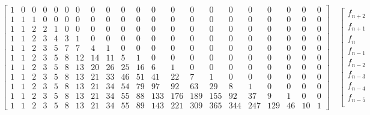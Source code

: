 \documentclass[a4paper,dottedtoc,headinclude,footinclude]{report} %
\theoremstyle{plain}
\begin{document}
    \begin{table}
        \begin{displaymath}
            \left[
                \begin{array}{ccccccccccccccccccccc}
                1 & 0 & 0 & 0 & 0 & 0 & 0 & 0 & 0 & 0 & 0 & 0 & 0 & 0 & 0 & 0 & 0 & 0 & 0 & 0 & 0\\
                1 & 1 & 1 & 0 & 0 & 0 & 0 & 0 & 0 & 0 & 0 & 0 & 0 & 0 & 0 & 0 & 0 & 0 & 0 & 0 & 0\\
                1 & 1 & 2 & 2 & 1 & 0 & 0 & 0 & 0 & 0 & 0 & 0 & 0 & 0 & 0 & 0 & 0 & 0 & 0 & 0 & 0\\
                1 & 1 & 2 & 3 & 4 & 3 & 1 & 0 & 0 & 0 & 0 & 0 & 0 & 0 & 0 & 0 & 0 & 0 & 0 & 0 & 0\\
                1 & 1 & 2 & 3 & 5 & 7 & 7 & 4 & 1 & 0 & 0 & 0 & 0 & 0 & 0 & 0 & 0 & 0 & 0 & 0 & 0\\
                1 & 1 & 2 & 3 & 5 & 8 & 12 & 14 & 11 & 5 & 1 & 0 & 0 & 0 & 0 & 0 & 0 & 0 & 0 & 0 & 0\\
                1 & 1 & 2 & 3 & 5 & 8 & 13 & 20 & 26 & 25 & 16 & 6 & 1 & 0 & 0 & 0 & 0 & 0 & 0 & 0 & 0\\
                1 & 1 & 2 & 3 & 5 & 8 & 13 & 21 & 33 & 46 & 51 & 41 & 22 & 7 & 1 & 0 & 0 & 0 & 0 & 0 & 0\\
                1 & 1 & 2 & 3 & 5 & 8 & 13 & 21 & 34 & 54 & 79 & 97 & 92 & 63 & 29 & 8 & 1 & 0 & 0 & 0 & 0\\
                1 & 1 & 2 & 3 & 5 & 8 & 13 & 21 & 34 & 55 & 88 & 133 & 176 & 189 & 155 & 92 & 37 & 9 & 1 & 0 & 0\\
                1 & 1 & 2 & 3 & 5 & 8 & 13 & 21 & 34 & 55 & 89 & 143 & 221 & 309 & 365 & 344 & 247 & 129 & 46 & 10 & 1
                \end{array}
                \right]  \quad %
                \left[
                    \begin{array}{c}
                        f_{n + 2}\\
                        f_{n + 1}\\
                        f_{n}\\
                        f_{n - 1}\\
                        f_{n - 2}\\
                        f_{n - 3}\\
                        f_{n - 4}\\
                        f_{n - 5}\\

\end{array}
\end{displaymath}
\end{table}
\end{document}
